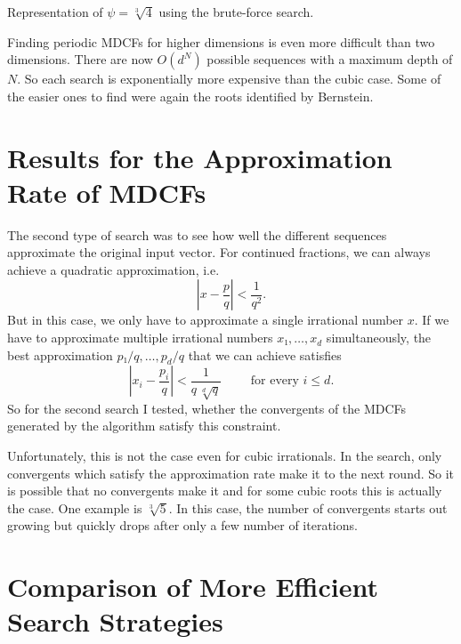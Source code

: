\begin{table}[t]
  \caption{Representation of $ψ = \sqrt[3]{4}$ using the brute-force search.}
  \label{table:cube-root-4}
  \centering
  \footnotesize
  
\end{table}

Finding periodic MDCFs for higher dimensions is even more difficult than two dimensions.
There are now $O(d^N)$ possible sequences with a maximum depth of $N$.
So each search is exponentially more expensive than the cubic case.
Some of the easier ones to find were again the roots identified by Bernstein.

\section{Results for the Approximation Rate of MDCFs}

The second type of search was to see how well the different sequences
approximate the original input vector.
For continued fractions, we can always achieve a quadratic approximation, i.e.
\[
  \left| x - \frac{p}{q} \right| < \frac{1}{q^2}.
\]
But in this case, we only have to approximate a single irrational number $x$.
If we have to approximate multiple irrational numbers $x₁, …, x_d$ simultaneously,
the best approximation $p₁/q, …, p_d/q$ that we can achieve satisfies
\[
  \left|x_i - \frac{p_i}{q}\right| < \frac{1}{q \, \sqrt[d]{q}} \qquad \text{ for every } i ≤ d.
\]
So for the second search I tested, whether the convergents of the MDCFs
generated by the algorithm satisfy this constraint.

Unfortunately, this is not the case even for cubic irrationals.
In the search, only convergents which satisfy the approximation rate make it to the next round.
So it is possible that no convergents make it
and for some cubic roots this is actually the case.
One example is $\sqrt[3]{5}$.
In this case, the number of convergents starts out growing but quickly drops
after only a few number of iterations.



\section{Comparison of More Efficient Search Strategies}

